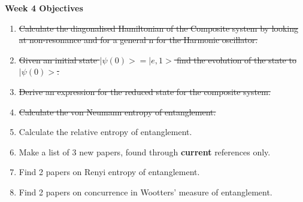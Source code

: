 \documentclass{article}
\begin{document}
\Large{\textbf{Week 4 Objectives}}
\\
\begin{enumerate}
    \item \sout{Calculate the diagonalised Hamiltonian of the Composite system by looking at non-resonance and for a general n for the Harmonic oscillator.}
    \item \sout{Given an initial state $|\psi(0)> = |e,1>$ find the evolution of the state to $|\psi(0)>$.}
    \item \sout{Derive an expression for the reduced state for the composite system.}
    \item \sout{Calculate the von Neumann entropy of entanglement.}
    \item Calculate the relative entropy of entanglement.
    \item {Make a list of 3 new papers, found through \textbf{current} references only.}
    \item Find 2 papers on Renyi entropy of entanglement.
    \item Find 2 papers on concurrence in Wootters' measure of entanglement.
    


\end{enumerate}
\end{document}
